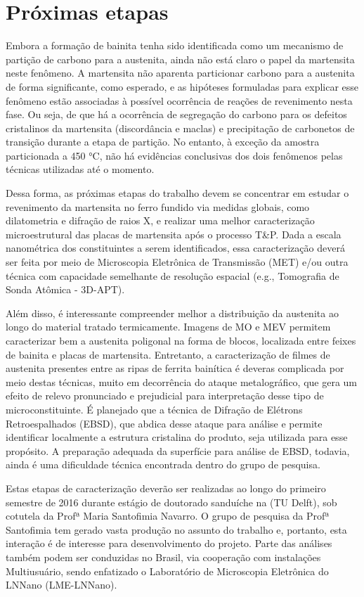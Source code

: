 \chapter{Próximas etapas}

Embora a formação de bainita tenha sido identificada como um mecanismo de partição de carbono para a austenita, ainda não está claro o papel da martensita neste fenômeno. A martensita não aparenta particionar carbono para a austenita de forma significante, como esperado, e as hipóteses formuladas para explicar esse fenômeno estão associadas à possível ocorrência de reações de revenimento nesta fase. Ou seja, de que há a ocorrência de segregação do carbono para os defeitos cristalinos da martensita (discordância e maclas) e precipitação de carbonetos de transição durante a etapa de partição. No entanto, à exceção da amostra particionada a 450 °C, não há evidências conclusivas dos dois fenômenos pelas técnicas utilizadas até o momento.

Dessa forma, as próximas etapas do trabalho devem se concentrar em estudar o revenimento da martensita no ferro fundido via medidas globais, como dilatometria e difração de raios X, e realizar uma melhor caracterização microestrutural das placas de martensita após o processo T\&P. Dada a escala nanométrica dos constituintes a serem identificados, essa caracterização deverá ser feita por meio de Microscopia Eletrônica de Transmissão (MET) e/ou outra técnica com capacidade semelhante de resolução espacial (e.g., Tomografia de Sonda Atômica - 3D-APT).

Além disso, é interessante compreender melhor a distribuição da austenita ao longo do material tratado termicamente. Imagens de MO e MEV permitem caracterizar bem a austenita poligonal na forma de blocos, localizada entre feixes de bainita e placas de martensita. Entretanto, a caracterização de filmes de austenita presentes entre as ripas de ferrita bainítica é deveras complicada por meio destas técnicas, muito em decorrência do ataque metalográfico, que gera um efeito de relevo pronunciado e prejudicial para interpretação desse tipo de microconstituinte. É planejado que a técnica de Difração de Elétrons Retroespalhados (EBSD), que abdica desse ataque para análise e permite identificar localmente a estrutura cristalina do produto, seja utilizada para esse propósito. A preparação adequada da superfície para análise de EBSD, todavia, ainda é uma dificuldade técnica encontrada dentro do grupo de pesquisa.

Estas etapas de caracterização deverão ser realizadas ao longo do primeiro semestre de 2016 durante estágio de doutorado sanduíche na  (TU Delft), sob cotutela da Profª Maria Santofimia Navarro. O grupo de pesquisa da Profª Santofimia tem gerado vasta produção no assunto do trabalho e, portanto, esta interação é de interesse para desenvolvimento do projeto. Parte das análises também podem ser conduzidas no Brasil, via cooperação com instalações Multiusuário, sendo enfatizado o Laboratório de Microscopia Eletrônica do LNNano (LME-LNNano).

